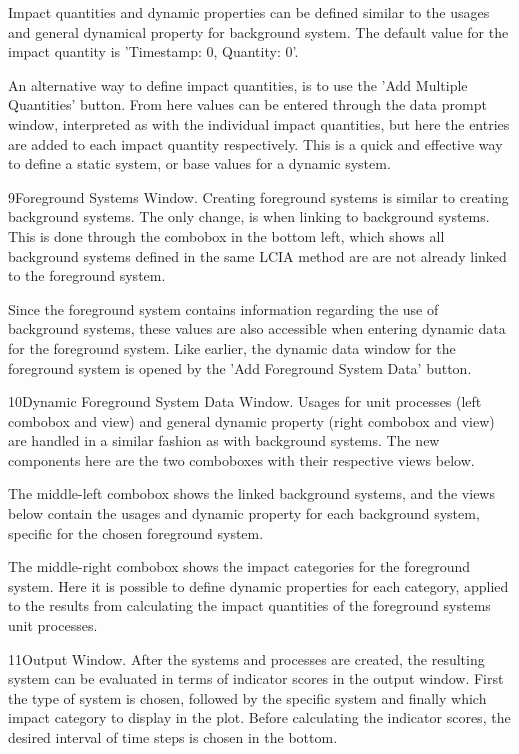 Impact quantities and dynamic properties can be defined similar to the usages and general dynamical property for background system. The default value for the impact quantity is 'Timestamp: 0, Quantity: 0'.

An alternative way to define impact quantities, is to use the 'Add Multiple Quantities' button. From here values can be entered through the data prompt window, interpreted as with the individual impact quantities, but here the entries are added to each impact quantity respectively. This is a quick and effective way to define a static system, or base values for a dynamic system.

\guide
{9}{Foreground Systems Window.}
Creating foreground systems is similar to creating background systems. The only change, is when linking to background systems. This is done through the combobox in the bottom left, which shows all background systems defined in the same LCIA method are are not already linked to the foreground system.

Since the foreground system contains information regarding the use of background systems, these values are also accessible when entering dynamic data for the foreground system. Like earlier, the dynamic data window for the foreground system is opened by the 'Add Foreground System Data' button.

\guide
{10}{Dynamic Foreground System Data Window.}
Usages for unit processes (left combobox and view) and general dynamic property (right combobox and view) are handled in a similar fashion as with background systems. The new components here are the two comboboxes with their respective views below. 

The middle-left combobox shows the linked background systems, and the views below contain the usages and dynamic property for each background system, specific for the chosen foreground system.

The middle-right combobox shows the impact categories for the foreground system. Here it is possible to define dynamic properties for each category, applied to the results from calculating the impact quantities of the foreground systems unit processes.

\guide
{11}{Output Window.}
After the systems and processes are created, the resulting system can be evaluated in terms of indicator scores in the output window. First the type of system is chosen, followed by the specific system and finally which impact category to display in the plot. Before calculating the indicator scores, the desired interval of time steps is chosen in the bottom. 

